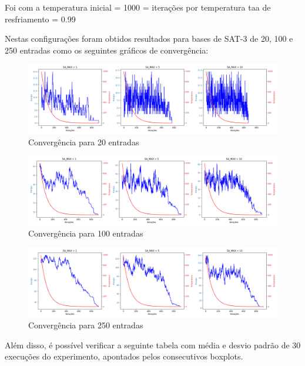\documentclass[12pt]{article}
\begin{document}

Foi com a temperatura inicial = 1000 = iterações por temperatura taa de resfriamento = 0.99 


Nestas configurações foram obtidos resultados para bases de SAT-3 de 20, 100 e 250 entradas como os seguintes gráficos de convergência:%

\begin{figure}[H]
  \centering
  \includegraphics[width=.9\textwidth]{../../melhores_sa_20.png}
  \caption{Convergência para 20 entradas}
  \label{fig:metodologia}
  \end{figure}

\begin{figure}[H]
  \centering
  \includegraphics[width=.9\textwidth]{../../melhores_sa_100.png}
  \caption{Convergência para 100 entradas}
  \label{fig:metodologia}
   \end{figure}

\begin{figure}[H]
  \centering
  \includegraphics[width=.9\textwidth]{../../melhores_sa_250.png}
  \caption{Convergência para 250 entradas}
  \label{fig:metodologia}
  \end{figure}


Além disso, é possível verificar a seguinte tabela com média e desvio padrão de 30 execuções do experimento, apontados pelos consecutivos boxplots.
\end{document}
